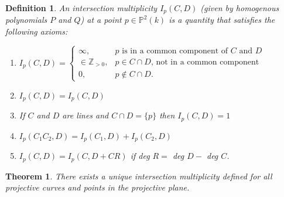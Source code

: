 \documentclass{article}
\newtheorem{theorem}{Theorem}
\newtheorem*{definition}{Definition}
\theoremstyle{remark}
\begin{document}
\begin{definition}
An intersection multiplicity $I_{p}(C,D)$ (given by homogenous polynomials $P$ and $Q$) at a point $p\in\mathbb{P}^{2}(k)$ is a quantity that satisfies the following axioms:
\begin{enumerate}
\item $I_{p}(C,D)=\begin{cases}
    \infty,                       & \text{$p$ is in a common component of $C$ and $D$}\\
    \in\mathbb{Z}_{>0}, & \text{$p\in C\cap D$, not in a common component}\\
    0,                            & \text{$p\not\in C\cap D$}.
  \end{cases}$
\item $I_{p}(C,D)=I_{p}(C,D)$
\item If $C$ and $D$ are lines and $C\cap D=\{p\}$ then $I_{p}(C,D)=1$
\item $I_{p}(C_1 C_2,D)=I_{p}(C_1,D)+I_{p}(C_2,D)$
\item $I_{p}(C,D)=I_{p}(C,D+CR)$ if deg $R=$ deg $D-$ deg $C$.
\end{enumerate}
\end{definition}
\begin{theorem}
There exists a unique intersection multiplicity defined for all projective curves and points in the projective plane.
\end{theorem}
\end{document}
